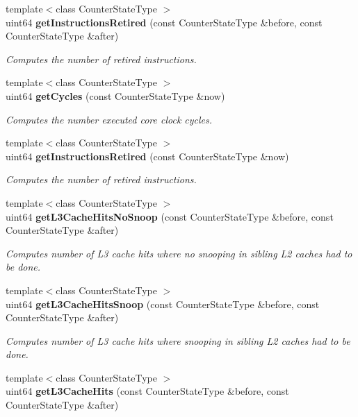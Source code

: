 \begin{DoxyCompactItemize}
{\footnotesize template$<$class Counter\+State\+Type $>$ }\\uint64 {\bf get\+Instructions\+Retired} (const Counter\+State\+Type \&before, const Counter\+State\+Type \&after)
\begin{DoxyCompactList}\small\item\em Computes the number of retired instructions. \end{DoxyCompactList}\item 
{\footnotesize template$<$class Counter\+State\+Type $>$ }\\uint64 {\bf get\+Cycles} (const Counter\+State\+Type \&now)
\begin{DoxyCompactList}\small\item\em Computes the number executed core clock cycles. \end{DoxyCompactList}\item 
{\footnotesize template$<$class Counter\+State\+Type $>$ }\\uint64 {\bf get\+Instructions\+Retired} (const Counter\+State\+Type \&now)
\begin{DoxyCompactList}\small\item\em Computes the number of retired instructions. \end{DoxyCompactList}\item 
{\footnotesize template$<$class Counter\+State\+Type $>$ }\\uint64 {\bf get\+L3\+Cache\+Hits\+No\+Snoop} (const Counter\+State\+Type \&before, const Counter\+State\+Type \&after)
\begin{DoxyCompactList}\small\item\em Computes number of L3 cache hits where no snooping in sibling L2 caches had to be done. \end{DoxyCompactList}\item 
{\footnotesize template$<$class Counter\+State\+Type $>$ }\\uint64 {\bf get\+L3\+Cache\+Hits\+Snoop} (const Counter\+State\+Type \&before, const Counter\+State\+Type \&after)
\begin{DoxyCompactList}\small\item\em Computes number of L3 cache hits where snooping in sibling L2 caches had to be done. \end{DoxyCompactList}\item 
{\footnotesize template$<$class Counter\+State\+Type $>$ }\\uint64 {\bf get\+L3\+Cache\+Hits} (const Counter\+State\+Type \&before, const Counter\+State\+Type \&after)

\end{DoxyCompactItemize}
